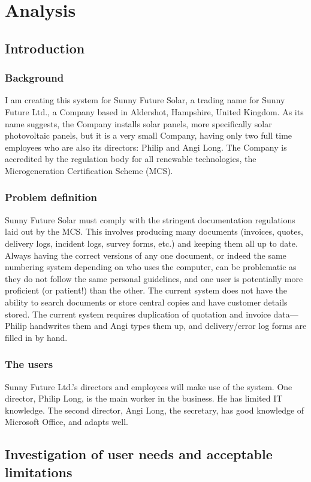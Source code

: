 \chapter{Analysis}
	\section{Introduction}
		\subsection{Background}
I am creating this system for Sunny Future Solar, a trading name for Sunny
Future Ltd., a Company based in Aldershot, Hampshire, United Kingdom.  As
its name suggests, the Company installs solar panels, more specifically
solar photovoltaic panels, but it is a very small Company, having only two
full time employees who are also its directors: Philip and Angi Long.  The Company is accredited by the regulation body for all renewable technologies, the Microgeneration Certification Scheme (MCS).
		\subsection{Problem definition}
Sunny Future Solar must comply with the stringent documentation regulations laid out by the MCS.  This involves producing many documents (invoices, quotes, delivery logs, incident logs, survey forms, etc.) and keeping them all up to date.  Always having the correct versions of any one document, or indeed the same numbering system depending on who uses the computer, can be problematic as they do not follow the same personal guidelines, and one user is potentially more proficient (or patient!) than the other.  The current system does not have the ability to search documents or store central copies and have customer details stored.  The current system requires duplication of quotation and invoice data---Philip handwrites them and Angi types them up, and delivery\slash error log forms are filled in by hand.
		\subsection{The users}
Sunny Future Ltd.'s directors and employees will make use of the system.  One director, Philip Long, is the main worker in the business.  He has limited IT knowledge.  The second director, Angi Long, the secretary, has good knowledge of Microsoft Office, and adapts well.
	\section{Investigation of user needs and acceptable limitations}
